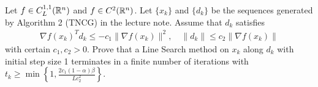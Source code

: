 \documentclass{ExerciseSheet}
\newif\ifsolutions
\begin{document}

\begin{problem}
Let $f\in C_L^{1,1}(\mathbb{R}^n)$ and $f\in C^2(\mathbb{R}^n)$. Let $\{x_k\}$ and $\{d_k\}$ be the sequences generated by Algorithm 2 (TNCG) in the lecture note. Assume that $d_k$ satisfies 
    \begin{align*}
        \nabla f(x_k)^Td_k \leq -c_1 \lVert \nabla f(x_k)\rVert^2, \quad \lVert d_k \rVert \leq c_2 \lVert \nabla f(x_k)\rVert
    \end{align*}
    with certain $c_1, c_2>0$. Prove that a Line Search method on $x_k$ along $d_k$ with initial step size 1 terminates in a finite number of iterations with $t_k \geq \min \left\{1,\frac{2c_1(1-\alpha)\beta}{Lc_2^2 }\right\}$.
\end{problem}

\ifsolutions
\vskip 0.3cm
\end{document}
